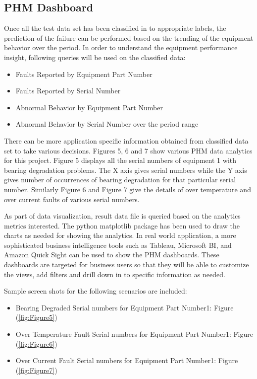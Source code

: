 \documentclass[sigconf]{acmart}
\begin{document}
\subsection{PHM Dashboard}
Once all the test data set has been classified in to appropriate labels, the prediction of the failure can be performed based on the trending of the equipment behavior over the period. In order to understand the equipment performance insight, following queries will be used on the classified data:
\begin{itemize}
  \item Faults Reported by Equipment Part Number
  \item Faults Reported by Serial Number
  \item Abnormal Behavior by Equipment Part Number
  \item Abnormal Behavior by Serial Number over the period range
\end{itemize}
There can be more application specific information obtained from classified data set to take various decisions. Figures 5, 6 and 7 show various PHM data analytics for this project. Figure 5 displays all the serial numbers of equipment 1 with bearing degradation problems. The X axis gives serial numbers while the Y axis gives number of occurrences of bearing degradation for that particular serial number. Similarly Figure 6 and Figure 7 give the details of over temperature and over current faults of various serial numbers.

As part of data visualization, result data file is queried based on the analytics metrics interested. The python matplotlib package has been used to draw the charts as needed for showing the analytics. In real world application, a more sophisticated business intelligence tools such as Tableau, Microsoft BI, and Amazon Quick Sight can be used to show the PHM dashboards. These dashboards are targeted for business users so that they will be able to customize the views, add filters and drill down in to specific information as needed. 

Sample screen shots for the following scenarios are included:

\begin{itemize}
  \item Bearing Degraded Serial numbers for Equipment Part Number1: Figure (\ref{fig:Figure5})
  \item Over Temperature Fault Serial numbers for Equipment Part Number1: Figure (\ref{fig:Figure6})
  \item Over Current Fault Serial numbers for Equipment Part Number1: Figure (\ref{fig:Figure7})
\end{itemize}
\end{document}
